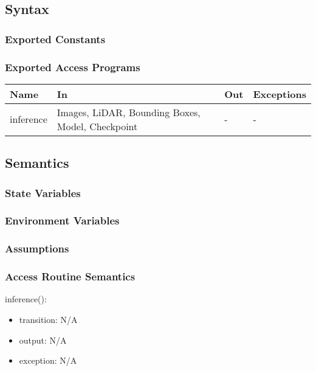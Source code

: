 \documentclass[12pt, titlepage]{article}
\begin{document}
\subsection{Syntax}



\subsubsection{Exported Constants}



\subsubsection{Exported Access Programs}

\begin{center}
\begin{tabular}{p{2cm}|p{6cm}|p{2cm}|p{2cm}}
\hline
\textbf{Name} & \textbf{In} & \textbf{Out} & \textbf{Exceptions} \\
\hline
inference & Images, LiDAR, Bounding Boxes, Model, Checkpoint & - & - \\
\hline
\end{tabular}
\end{center}

\subsection{Semantics}

\subsubsection{State Variables}


\subsubsection{Environment Variables}


\subsubsection{Assumptions}



\subsubsection{Access Routine Semantics}
\noindent inference():
\begin{itemize}
\item transition: N/A 
\item output: N/A
\item exception: N/A
\end{itemize}
\end{document}

